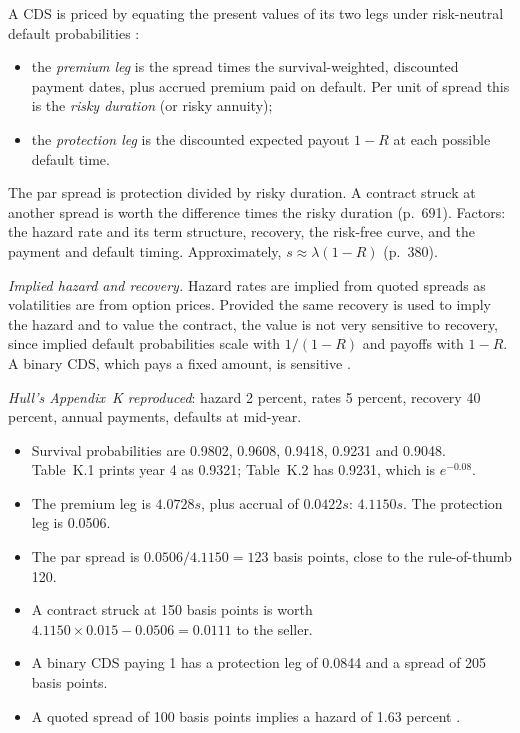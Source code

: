 \begin{qfmethod}\label{meth:cds-pricing}
 A CDS is priced by equating the present values of its two legs under risk-neutral default probabilities \citep[pp.~689--691]{risk-management-financial-institutions-2023}:
\begin{itemize}
\item the \emph{premium leg} is the spread times the survival-weighted, discounted payment dates, plus accrued premium paid on default. Per unit of spread this is the \emph{risky duration} (or risky annuity);
\item the \emph{protection leg} is the discounted expected payout $1-R$ at each possible default time.
\end{itemize}
The par spread is protection divided by risky duration. A contract struck at another spread is worth the difference times the risky duration (p.~691). Factors: the hazard rate and its term structure, recovery, the risk-free curve, and the payment and default timing. Approximately, $s\approx\lambda(1-R)$ (p.~380).

\emph{Implied hazard and recovery.} Hazard rates are implied from quoted spreads as volatilities are from option prices. Provided the same recovery is used to imply the hazard and to value the contract, the value is not very sensitive to recovery, since implied default probabilities scale with $1/(1-R)$ and payoffs with $1-R$. A binary CDS, which pays a fixed amount, is sensitive \citep[pp.~594--595]{s7-hulloptions}.

 \emph{Hull's Appendix~K reproduced}: hazard 2 percent, rates 5 percent, recovery 40 percent, annual payments, defaults at mid-year.
\begin{itemize}
\item Survival probabilities are 0.9802, 0.9608, 0.9418, 0.9231 and 0.9048. Table~K.1 prints year 4 as 0.9321; Table~K.2 has 0.9231, which is $e^{-0.08}$.
\item The premium leg is $4.0728s$, plus accrual of $0.0422s$: $4.1150s$. The protection leg is 0.0506.
\item The par spread is $0.0506/4.1150=123$ basis points, close to the rule-of-thumb 120.
\item A contract struck at 150 basis points is worth $4.1150\times0.015-0.0506=0.0111$ to the seller.
\item A binary CDS paying 1 has a protection leg of 0.0844 and a spread of 205 basis points.
\item A quoted spread of 100 basis points implies a hazard of 1.63 percent \citep[p.~594]{s7-hulloptions}.
\end{itemize}


\end{qfmethod}
